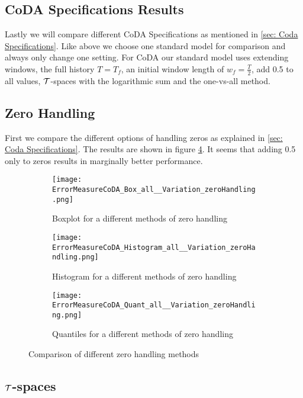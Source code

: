 \subsection{CoDA Specifications Results}
\label{sec: CoDA Specifications Results}

Lastly we will compare different CoDA Specifications as mentioned in \ref{sec: Coda Specifications}. Like above we choose one standard model for comparison and always only change one setting. For CoDA our standard model uses extending windows, the full history $T=T_f$, an initial window length of $w_f=\frac{T}{2}$, add 0.5 to all values, $\mathcal{T}$-spaces with the logarithmic sum and the one-vs-all method. 

\subsection{Zero Handling}
\label{sec: Zero Handling}

First we compare the different options of handling zeros as explained in \ref{sec: Coda Specifications}. The results are shown in figure \ref{fig:Coda zero handling Comp1}. It seems that adding 0.5 only to zeros results in marginally better performance.

\begin{figure}[htb!]
\centering
\begin{subfigure}[b]{0.45\textwidth}
\texttt{[image: ErrorMeasureCoDA\_Box\_all\_\_Variation\_zeroHandling.png]}
\caption{Boxplot for a different methods of zero handling}
\label{fig:Coda zero handling Box}
\end{subfigure}
\hfill
\begin{subfigure}[b]{0.45\textwidth}
\texttt{[image: ErrorMeasureCoDA\_Histogram\_all\_\_Variation\_zeroHandling.png]}
\caption{Histogram for a different methods of zero handling}
\label{fig:Coda zero handling Hist}
\end{subfigure}
\hfill
\begin{subfigure}[b]{0.8\textwidth}
\texttt{[image: ErrorMeasureCoDA\_Quant\_all\_\_Variation\_zeroHandling.png]}
\caption{Quantiles for a different methods of zero handling}
\label{fig:Coda zero handling Quant}
\end{subfigure}
\caption{Comparison of different zero handling methods}
\label{fig:Coda zero handling Comp1}
\end{figure}


\subsection{$\mathcal{T}$-spaces}
\label{sec: Tspaces results}

